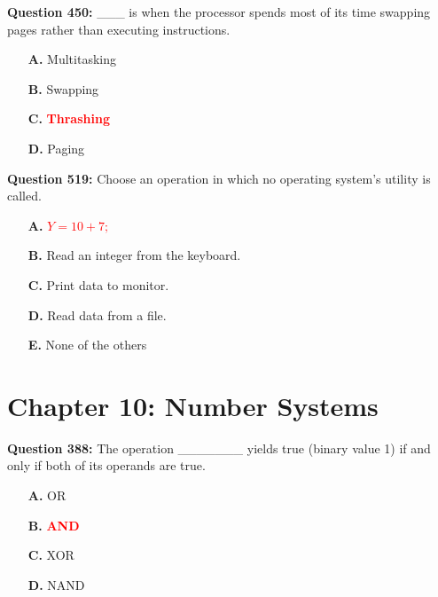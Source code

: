 \documentclass[12pt,a4paper]{article}
\begin{document}
\vspace{0.5cm}

\textbf{Question 450:} ___ is when the processor spends most of its time swapping pages rather than executing instructions.

\begin{itemize}
    \item[\textbf{A.}] Multitasking
    \item[\textbf{B.}] Swapping
    \item[\textbf{C.}] \textcolor{red}{\textbf{Thrashing}}
    \item[\textbf{D.}] Paging
\end{itemize}

\vspace{0.5cm}

\textbf{Question 519:} Choose an operation in which no operating system's utility is called.

\begin{itemize}
    \item[\textbf{A.}] \textcolor{red}{\textbf{$Y = 10 + 7;$}}
    \item[\textbf{B.}] Read an integer from the keyboard.
    \item[\textbf{C.}] Print data to monitor.
    \item[\textbf{D.}] Read data from a file.
    \item[\textbf{E.}] None of the others
\end{itemize}

\vspace{0.5cm}

\section{Chapter 10: Number Systems}

\textbf{Question 388:} The operation _______ yields true (binary value 1) if and only if both of its operands are true.

\begin{itemize}
    \item[\textbf{A.}] OR
    \item[\textbf{B.}] \textcolor{red}{\textbf{AND}}
    \item[\textbf{C.}] XOR
    \item[\textbf{D.}] NAND
\end{itemize}

\vspace{0.5cm}
\end{document}
